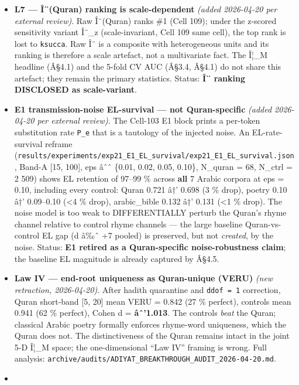 \documentclass[
]{article}
\begin{document}
\begin{itemize}
  108, \texttt{ULTIMATE\_REPORT.json::L6}), statistically
  indistinguishable from zero across 7 Arabic corpora. Status:
  \textbf{NULL}.
\item
  \textbf{L7 --- Î¨(Quran) ranking is scale-dependent} \emph{(added
  2026-04-20 per external review)}. Raw Î¨(Quran) ranks \#1 (Cell 109);
  under the z-scored sensitivity variant Î¨\_z (scale-invariant, Cell
  109 same cell), the top rank is lost to \texttt{ksucca}. Raw Î¨ is a
  composite with heterogeneous units and its ranking is therefore a
  scale artefact, not a multivariate fact. The Î¦\_M headline (Â§4.1)
  and the 5-fold CV AUC (Â§3.4, Â§4.1) do not share this artefact; they
  remain the primary statistics. Status: \textbf{Î¨ ranking DISCLOSED as
  scale-variant}.
\item
  \textbf{E1 transmission-noise EL-survival --- not Quran-specific}
  \emph{(added 2026-04-20 per external review)}. The Cell-103 E1 block
  prints a per-token substitution rate \texttt{P\_e} that is a tautology
  of the injected noise. An EL-rate-survival reframe
  (\texttt{results/experiments/exp21\_E1\_EL\_survival/exp21\_E1\_EL\_survival.json},
  Band-A {[}15, 100{]}, eps âˆˆ \{0.01, 0.02, 0.05, 0.10\}, N\_quran =
  68, N\_ctrl = 2 509) shows EL retention of 97--99 \% across
  \textbf{all} 7 Arabic corpora at eps = 0.10, including every control:
  Quran 0.721 â†' 0.698 (3 \% drop), poetry 0.10 â†' 0.09--0.10
  (\textless4 \% drop), arabic\_bible 0.132 â†' 0.131 (\textless1 \%
  drop). The noise model is too weak to DIFFERENTIALLY perturb the
  Quran's rhyme channel relative to control rhyme channels --- the large
  baseline Quran-vs-control EL gap (d â‰ˆ +7 pooled) is preserved, but
  not \emph{created}, by the noise. Status: \textbf{E1 retired as a
  Quran-specific noise-robustness claim}; the baseline EL magnitude is
  already captured by Â§4.5.
\item
  \textbf{Law IV --- end-root uniqueness as Quran-unique (VERU)}
  \emph{(new retraction, 2026-04-20)}. After hadith quarantine and
  \texttt{ddof\ =\ 1} correction, Quran short-band {[}5, 20{]} mean VERU
  = 0.842 (27 \% perfect), controls mean 0.941 (62 \% perfect), Cohen d
  = \textbf{âˆ'1.013}. The controls \emph{beat} the Quran; classical
  Arabic poetry formally enforces rhyme-word uniqueness, which the Quran
  does not. The distinctiveness of the Quran remains intact in the joint
  5-D Î¦\_M space; the one-dimensional ``Law IV'' framing is wrong. Full
  analysis:
  \texttt{archive/audits/ADIYAT\_BREAKTHROUGH\_AUDIT\_2026-04-20.md}.
\item

\end{itemize}
\end{document}
